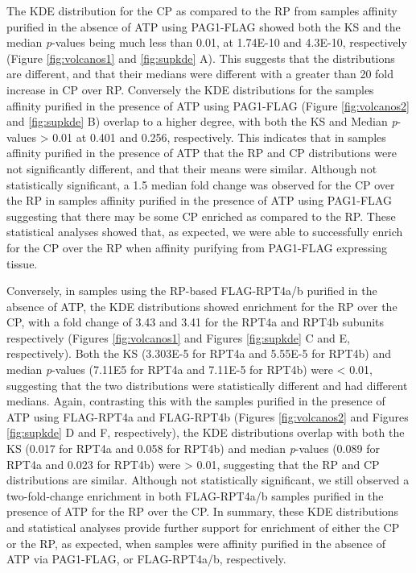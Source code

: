 The KDE distribution for the CP as compared to the RP from samples affinity purified in the absence of ATP using PAG1-FLAG showed both the KS and the median \textit{p}-values being much less than 0.01, at 1.74E-10 and 4.3E-10, respectively (Figure \ref{fig:volcanos1} and \ref{fig:supkde} A). This suggests that the distributions are different, and that their medians were different with a greater than 20 fold increase in CP over RP. Conversely the KDE distributions for the samples affinity purified in the presence of ATP using PAG1-FLAG (Figure \ref{fig:volcanos2} and \ref{fig:supkde} B) overlap to a higher degree, with both the KS and Median \textit{p}-values > 0.01 at 0.401 and 0.256, respectively. This indicates that in samples affinity purified in the presence of ATP that the RP and CP distributions were not significantly different, and that their means were similar. Although not statistically significant, a 1.5 median fold change was observed for the CP over the RP in samples affinity purified in the presence of ATP using PAG1-FLAG suggesting that there may be some CP enriched as compared to the RP. These statistical analyses showed that, as expected, we were able to successfully enrich for the CP over the RP when affinity purifying from PAG1-FLAG expressing tissue.

	Conversely, in samples using the RP-based FLAG-RPT4a/b purified in the absence of ATP, the KDE distributions showed enrichment for the RP over the CP, with a fold change of 3.43 and 3.41 for the RPT4a and RPT4b subunits respectively (Figures \ref{fig:volcanos1} and Figures \ref{fig:supkde} C and E, respectively). Both the KS (3.303E-5 for RPT4a and 5.55E-5 for RPT4b) and median \textit{p}-values (7.11E5 for RPT4a and 7.11E-5 for RPT4b) were < 0.01, suggesting that the two distributions were statistically different and had different medians. Again, contrasting this with the samples purified in the presence of ATP using FLAG-RPT4a and FLAG-RPT4b (Figures \ref{fig:volcanos2} and Figures \ref{fig:supkde} D and F, respectively), the KDE distributions overlap with both the KS (0.017 for RPT4a and 0.058 for RPT4b) and median \textit{p}-values (0.089 for RPT4a and 0.023 for RPT4b) were > 0.01, suggesting that the RP and CP distributions are similar. Although not statistically significant, we still observed a two-fold-change enrichment in both FLAG-RPT4a/b samples purified in the presence of ATP for the RP over the CP. In summary, these KDE distributions and statistical analyses provide further support for enrichment of either the CP or the RP, as expected, when samples were affinity purified in the absence of ATP via PAG1-FLAG, or FLAG-RPT4a/b, respectively.

